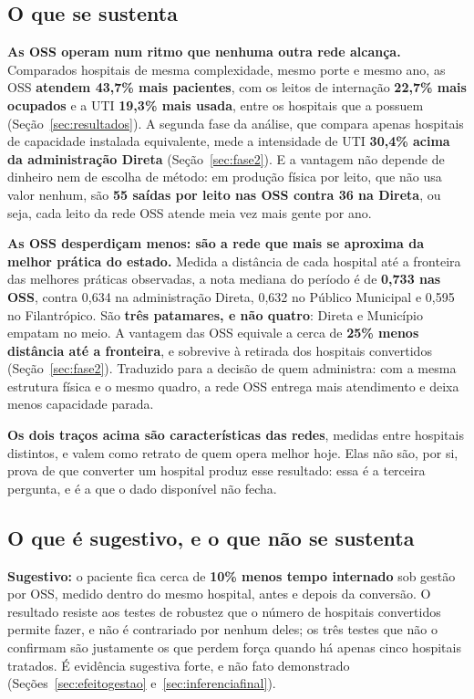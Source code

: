 \subsection*{O que se sustenta}

\textbf{As OSS operam num ritmo que nenhuma outra rede alcança.}
Comparados hospitais de mesma complexidade, mesmo porte e mesmo ano, as
OSS \textbf{atendem 43,7\% mais pacientes}, com os leitos de internação
\textbf{22,7\% mais ocupados} e a UTI \textbf{19,3\% mais usada}, entre os
hospitais que a possuem (Seção~\ref{sec:resultados}). A segunda fase da
análise, que compara apenas hospitais de capacidade instalada
equivalente, mede a intensidade de UTI \textbf{30,4\% acima da
administração Direta} (Seção~\ref{sec:fase2}). E a vantagem não depende de
dinheiro nem de escolha de método: em produção física por leito, que não
usa valor nenhum, são \textbf{55 saídas por leito nas OSS contra 36 na
Direta}, ou seja, cada leito da rede OSS atende meia vez mais gente por
ano.

\textbf{As OSS desperdiçam menos: são a rede que mais se aproxima da
melhor prática do estado.} Medida a distância de cada hospital até a
fronteira das melhores práticas observadas, a nota mediana do período é de
\textbf{0,733 nas OSS}, contra 0,634 na administração Direta, 0,632 no
Público Municipal e 0,595 no Filantrópico. São \textbf{três patamares, e
não quatro}: Direta e Município empatam no meio. A vantagem das OSS
equivale a cerca de \textbf{25\% menos distância até a fronteira}, e
sobrevive à retirada dos hospitais convertidos
(Seção~\ref{sec:fase2}). Traduzido para a decisão de quem administra: com
a mesma estrutura física e o mesmo quadro, a rede OSS entrega mais
atendimento e deixa menos capacidade parada.

\textbf{Os dois traços acima são características das redes}, medidas entre
hospitais distintos, e valem como retrato de quem opera melhor hoje. Elas
não são, por si, prova de que converter um hospital produz esse resultado:
essa é a terceira pergunta, e é a que o dado disponível não fecha.

\subsection*{O que é sugestivo, e o que não se sustenta}

\textbf{Sugestivo:} o paciente fica cerca de \textbf{10\% menos tempo
internado} sob gestão por OSS, medido dentro do mesmo hospital, antes e
depois da conversão. O resultado resiste aos testes de robustez que o
número de hospitais convertidos permite fazer, e não é contrariado por
nenhum deles; os três testes que não o confirmam são justamente os que
perdem força quando há apenas cinco hospitais tratados. É evidência
sugestiva forte, e não fato demonstrado
(Seções~\ref{sec:efeitogestao} e~\ref{sec:inferenciafinal}).

